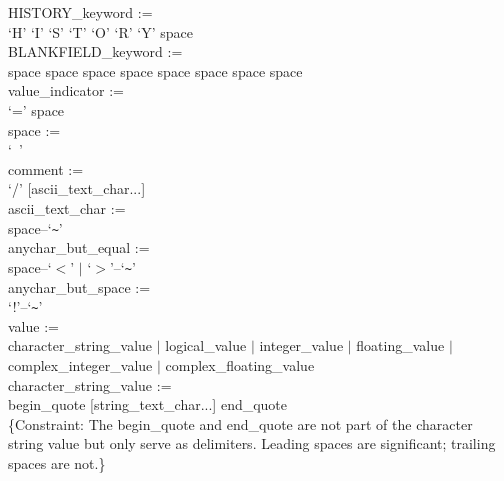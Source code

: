 \documentclass[11pt,makeidx]{book}     %
\begin{document}
HISTORY\_keyword :=  \\ \null \hspace{0.5in}
	`H' `I' `S' `T' `O' `R' `Y' space \\

BLANKFIELD\_keyword :=  \\ \null \hspace{0.5in}
	space space space space space space space space \\

value\_indicator :=  \\ \null \hspace{0.5in}
	`=' space \\

space :=   \\ \null \hspace{0.5in}
	`\verb+ +' \\

comment :=  \\ \null \hspace{0.5in}
	`/' [ascii\_text\_char...] \\

ascii\_text\_char :=  \\ \null \hspace{0.5in}
	space--`\verb+~+' \\

anychar\_but\_equal :=  \\ \null \hspace{0.5in}
	space--`$<$' $|$ `$>$'--`\verb+~+' \\

anychar\_but\_space :=  \\ \null \hspace{0.5in}
	`!'--`\verb+~+' \\

value :=   \\ \null \hspace{0.5in}
	character\_string\_value $|$ logical\_value $|$ integer\_value $|$ 
	floating\_value $|$ \\ \null \hspace{0.5in}
	complex\_integer\_value $|$ complex\_floating\_value \\

character\_string\_value :=   \\ \null \hspace{0.5in}
	begin\_quote [string\_text\_char...] end\_quote \\
\{Constraint: The begin\_quote and end\_quote are not part of the
character string value but only serve as delimiters.  Leading spaces are
significant; trailing spaces are not.\} \\
\end{document}
